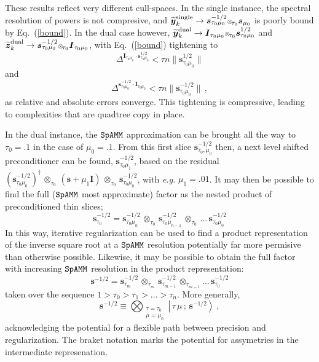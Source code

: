 \documentclass[letterpaper,twocolumn,amsmath,amsfont,amssymb,english,aps,jcp,preprintnumbers,groupaddress,nofootinbib,tightenlines,floatfix]{revtex4}
\newcommand{\mat}[1]{\boldsymbol{#1}}
\newcommand{\oto}{ {\scriptstyle \otimes}_{ \! \tau_0 } }
\newcommand{\otm}{ {\scriptstyle \otimes}_{ \! \tau_m } }
\newcommand{\otmm}{ {\scriptstyle \otimes}_{ \! \tau_{m-1}}}
\theoremstyle{plain}
\theoremstyle{remark}
\theoremstyle{plain}
\begin{document}
These results reflect very different cull-spaces.  In the single instance, the spectral resolution of powers is not compresive, and  
$\widetilde{\mat{y}}^{\rm single}_k \rightarrow  \mat{s}^{-1/2}_{\tau_0 \mu_0} \oto \mat{s}_{\mu_0}$ is  poorly bound by Eq.~(\ref{bound}).
In the dual case however, $\widetilde{\mat{y}}^{\rm dual}_k \rightarrow  \mat{I}_{\tau_0 \mu_0} \oto \mat{s}^{1/2}_{\tau_0 \mu_0}$
and $\widetilde{\mat{z}}^{\rm dual}_k \rightarrow  \mat{s}^{-1/2}_{\tau_0 \mu_0} \oto \mat{I}_{\tau_0 \mu_0}$, 
with Eq.~(\ref{bound}) tightening to
\begin{equation}\label{boundY}
\Delta^{\mat{I}_{\tau_0 \mu_0} \cdot \mat{s}^{1/2}_{\tau_0 \mu_0}} <  \tau n \lVert \mat{s}^{1/2}_{\tau_0 \mu_0} \rVert
\end{equation}
and 
\begin{equation}\label{boundZ}
\Delta^{ \mat{s}^{-1/2}_{\tau_0 \mu_0}\cdot \mat{I}_{\tau_0 \mu_0}}  <  \tau n \lVert \mat{s}^{-1/2}_{\tau_0 \mu_0} \rVert \, ,
\end{equation}
as relative and absolute errors converge.  This tightening is compressive, leading to complexities that are quadtree copy in place.   

In the dual instance, the $\tt SpAMM$ approximation can be brought all the way to  $\tau_0 = .1$ in the case of $\mu_0 = .1$.
From this first slice  $\mat{s}^{-1/2}_{\tau_0, \mu_0}$ then, a next level shifted preconditioner can be found, 
$\mat{s}^{-1/2}_{\tau_0 \mu_1}$, based on the residual 
$\left(\mat{s}^{-1/2}_{\tau_0\mu_0} \right)^\dagger \, \oto \, \left(\mat{s}+\mu_1 \mat{I} \right)  \, \oto \,\mat{s}^{-1/2}_{\tau_0 \mu_0} $, with {\em e.g.} 
$\mu_1= .01$. It may then be possible to find the full ($\tt SpAMM$ most approximate) 
factor as the nested product of preconditioned thin slices;
\begin{equation}
\mat{s}^{-1/2}_{\tau_0} = \mat{s}^{-1/2}_{\tau_0 \mu_n} \, \oto \, \mat{s}^{-1/2}_{\tau_0 \mu_{n-1}} \, \oto \, \dots  \,  \mat{s}^{-1/2}_{\tau_0 \mu_0}
\end{equation}
In this way, 
iterative regularization can be used to find a product representation of the inverse square root at a $\tt SpAMM$ resolution 
potentially far more permisive than otherwise possible. 
Likewise, it may be possible to obtain the full factor with increasing $\tt SpAMM$ resolution in the product representation:
\begin{equation}
\mat{s}^{-1/2} = \mat{s}^{-1/2}_{\tau_m} \, \otm \,  \mat{s}^{-1/2}_{\tau_{m-1}} \, \otmm \dots \, \mat{s}^{-1/2}_{\tau_0}
\end{equation}taken over the sequence $1 > \tau_0 > \tau_1 > \dots > \tau_n $.  More generally,
\begin{equation} \label{spammsandwich}
\mat{s}^{-1/2} \equiv \bigotimes_{\substack{\tau=\tau_0 \\ \mu=\mu_0   } } {\left|\, \tau\, \mu \, ; \, \scriptstyle{\mat{s}^{-1/2}}  \right>}  \, ,
\end{equation}
acknowledging the potential for a flexible path between precision and regularization. The braket notation marks 
the potential for assymetries in the intermediate represenation.  
\end{document}
